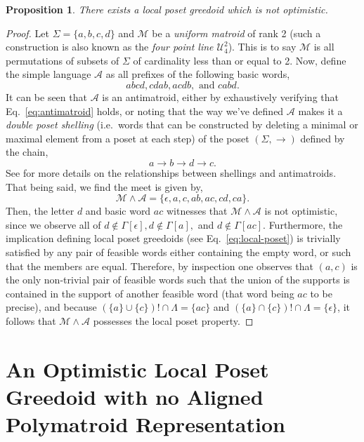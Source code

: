 \documentclass[11pt]{article}
\newtheorem{proposition}[theorem]{Proposition}
\newcommand{\univ}{\Sigma}
\newcommand{\glang}{\Lambda}
\begin{document}
\begin{proposition}\label{prop:trimmed-optimism}
    There exists a local poset greedoid which is not optimistic.
\end{proposition}
\begin{proof}
    Let $\univ = \{a,b,c,d\}$ and $\mathcal{M}$ be a \emph{uniform matroid} of rank 2 (such a construction is also known as the \emph{four point line $\mathcal{U}^2_4$}).
    This is to say $\mathcal{M}$ is all permutations of subsets of $\univ$ of cardinality less than or equal to 2.
    Now, define the simple language $\mathcal{A}$ as all prefixes of the following basic words,
    \[
        abcd,cdab,acdb,\text{ and }cabd.
    \]
    It can be seen that $\mathcal{A}$ is an antimatroid, either by exhaustively verifying that Eq.~\ref{eq:antimatroid} holds, or noting that the way we've defined $\mathcal{A}$ makes it a \emph{double poset shelling} (i.e.\ words that can be constructed by deleting a minimal or maximal element from a poset at each step) of the poset $(\univ,\rightarrow)$ defined by the chain,
    \[
        a\rightarrow b \rightarrow d \rightarrow c.
    \]
    See \cite{korte2012greedoids} for more details on the relationships between shellings and antimatroids.
    That being said, we find the meet is given by,
    \[
        \mathcal{M}\wedge\mathcal{A} = \{\epsilon, a, c, ab, ac, cd, ca\}.
    \]
    Then, the letter $d$ and basic word $ac$ witnesses that $\mathcal{M}\wedge \mathcal{A}$ is not optimistic, since we observe all of $d\notin\Gamma[\epsilon], d \notin \Gamma[a],$ and $d \notin \Gamma[ac].$
    Furthermore, the implication defining local poset greedoids (see Eq.~\ref{eq:local-poset}) is trivially satisfied by any pair of feasible words either containing the empty word, or such that the members are equal.
    Therefore, by inspection one observes that $(a,c)$ is the only non-trivial pair of feasible words such that the union of the supports is contained in the support of another feasible word (that word being $ac$ to be precise), and because $(\{a\}\cup\{c\})! \cap \glang = \{ac\}$ and $(\{a\}\cap\{c\})! \cap \glang = \{\epsilon\}$, it follows that $\mathcal{M}\wedge \mathcal{A}$ possesses the local poset property.
\end{proof}
\fi

\section{An Optimistic Local Poset Greedoid with no Aligned Polymatroid Representation}\label{app:local-augmentation}
\end{document}
